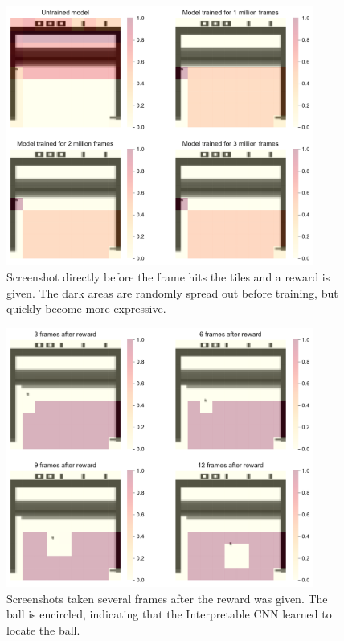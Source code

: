 \begin{figure}[ht!]
    \centering
    \includegraphics[width=0.9\textwidth]{plots/heatmaps/breakout_heatmap_training_comparison_before_reward.pdf}
    \caption{Screenshot directly before the frame hits the tiles and a reward is given. The dark areas are randomly spread out before training, but quickly become more expressive.}
    \label{fig:heatmap_before_reward_comparison}
\end{figure}

\begin{figure}[ht!]
    \centering
    \includegraphics[width=0.9\textwidth]{plots/heatmaps/breakout_heatmap_temporal_comparison_after_reward.pdf}
    \caption{Screenshots taken several frames after the reward was given. The ball is encircled, indicating that the Interpretable CNN learned to locate the ball.}
    \label{fig:heatmap_after_reward_comparison}
\end{figure}

